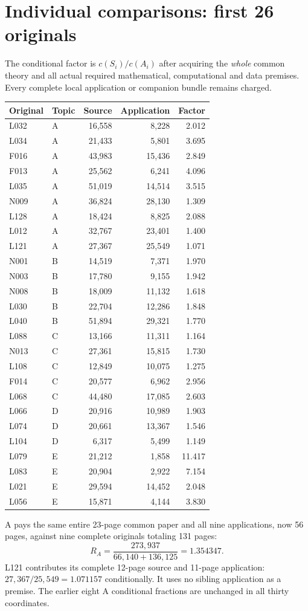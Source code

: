 \documentclass[11pt,a4paper]{article}
\begin{document}
\section*{Individual comparisons: first 26 originals}
The conditional factor is $c(S_i)/c(A_i)$ after acquiring the \emph{whole} common theory and all actual required mathematical, computational and data premises. Every complete local application or companion bundle remains charged.
\begin{center}\small\begin{tabular}{llrrr}\toprule
Original & Topic & Source & Application & Factor\\\midrule
L032 & A & 16,558 & 8,228 & 2.012 \\
L034 & A & 21,433 & 5,801 & 3.695 \\
F016 & A & 43,983 & 15,436 & 2.849 \\
F013 & A & 25,562 & 6,241 & 4.096 \\
L035 & A & 51,019 & 14,514 & 3.515 \\
N009 & A & 36,824 & 28,130 & 1.309 \\
L128 & A & 18,424 & 8,825 & 2.088 \\
L012 & A & 32,767 & 23,401 & 1.400 \\
L121 & A & 27,367 & 25,549 & 1.071 \\
N001 & B & 14,519 & 7,371 & 1.970 \\
N003 & B & 17,780 & 9,155 & 1.942 \\
N008 & B & 18,009 & 11,132 & 1.618 \\
L030 & B & 22,704 & 12,286 & 1.848 \\
L040 & B & 51,894 & 29,321 & 1.770 \\
L088 & C & 13,166 & 11,311 & 1.164 \\
N013 & C & 27,361 & 15,815 & 1.730 \\
L108 & C & 12,849 & 10,075 & 1.275 \\
F014 & C & 20,577 & 6,962 & 2.956 \\
L068 & C & 44,480 & 17,085 & 2.603 \\
L066 & D & 20,916 & 10,989 & 1.903 \\
L074 & D & 20,661 & 13,367 & 1.546 \\
L104 & D & 6,317 & 5,499 & 1.149 \\
L079 & E & 21,212 & 1,858 & 11.417 \\
L083 & E & 20,904 & 2,922 & 7.154 \\
L021 & E & 29,594 & 14,452 & 2.048 \\
L056 & E & 15,871 & 4,144 & 3.830 \\\bottomrule\end{tabular}\end{center}
A pays the same entire 23-page common paper and all nine applications, now 56 pages, against nine complete originals totaling 131 pages:
\[R_A=\frac{273,937}{66,140+136,125}=1.354347.\]
L121 contributes its complete 12-page source and 11-page application: $27,367/25,549=1.071157$ conditionally. It uses no sibling application as a premise. The earlier eight A conditional fractions are unchanged in all thirty coordinates.
\newpage
\end{document}
